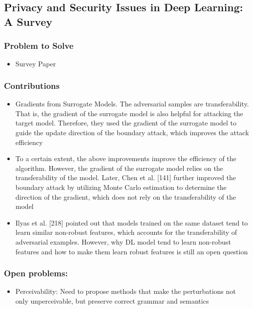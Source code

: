 \documentclass{article}
\begin{document}
\begin{flushleft}
 



\subsection{ Privacy and Security Issues in Deep Learning: A Survey \cite{liu2020privacy}} 
\subsubsection*{Problem to Solve}
\begin{itemize}
    \item Survey Paper
\end{itemize}

\subsubsection*{Contributions}
\begin{itemize}
 \item Gradients from Surrogate Models. The adversarial samples are transferability. That is, the gradient of
the surrogate model is also helpful for attacking the target model. Therefore, they used the gradient of the
surrogate model to guide the update direction of the boundary attack, which improves the attack efficiency

\item To a certain extent, the above improvements improve the efficiency of the algorithm. However, the gradient of the surrogate model relies on the transferability of the model. Later, Chen et al. [141] further improved the boundary attack by
utilizing Monte Carlo estimation to determine the direction of the gradient, which does not rely on the transferability of the model

\item Ilyas et al. [218] pointed out that models trained on the same dataset tend to learn similar non-robust features, which accounts for the transferability of adversarial examples. However, why DL model tend to learn non-robust features and how to make them learn robust
features is still an open question 

\end{itemize}

\subsubsection*{Open problems:}
\begin{itemize}
  \item Perceivability: Need to propose methods that make the perturbations not only unperceivable, but preserve correct grammar and semantics      
\end{itemize}


\end{flushleft}
\end{document}
